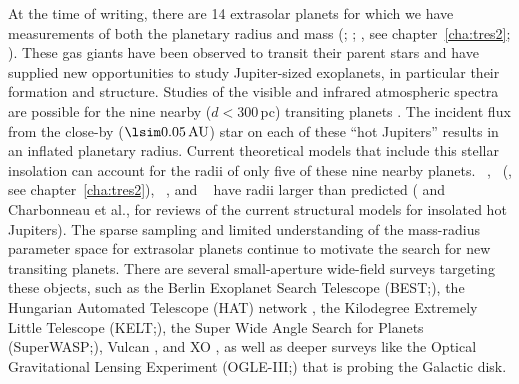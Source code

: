 At the time of writing, there are 14 extrasolar planets for which we have measurements of both the planetary radius
and mass (\citealp*[see][for a review]{Charbonneau_Brown_Burrows:PPV:2007a}; \citealt{McCullough_Stys_Valenti:apj:2006a}; \citealt{ODonovan_Charbonneau_Mandushev:apjl:2006a},%
see chapter~\ref{cha:tres2}; \citealt{Bakos_Noyes_Kovacs:apj:2007a, Collier-Cameron_Bouchy_Hebrard:MNRAS:2007a}).%
These gas giants have been observed to transit their parent stars and have supplied new opportunities to study
Jupiter-sized exoplanets, in particular their formation and structure. Studies of the visible and infrared atmospheric
spectra are possible for the nine nearby ($d<300$\,pc) transiting planets
\citep{Charbonneau_Brown_Noyes:apj:2002a, Vidal-Madjar_Lecavelier-des-Etangs_Desert:nat:2003a, Deming_Brown_Charbonneau:apj:2005a, Deming_Seager_Richardson:nat:2005a, Charbonneau_Allen_Megeath:apj:2005a}.
The incident flux from the close-by (\mbox{$\lsim0.05\,\mathrm{AU}$}) star on each of these ``hot Jupiters'' results
in an inflated planetary radius. Current theoretical models that include this stellar insolation can account for the
radii of only five of these nine nearby planets. \hdTZNb\
\citep{Charbonneau_Brown_Latham:apjl:2000a, Henry_Marcy_Butler:apj:2000a}, \tresTwo\
(\citealp{ODonovan_Charbonneau_Mandushev:apjl:2006a}, see chapter~\ref{cha:tres2}), \hatponeb\
\citep{Bakos_Noyes_Kovacs:apj:2007a}, and \wasponeb\ \citep{Collier-Cameron_Bouchy_Hebrard:MNRAS:2007a}
have radii larger than predicted (\citealp[see][]{Laughlin_Wolf_Vanmunster:apj:2005a} and Charbonneau et al.,%
\citeyear{Charbonneau_Brown_Burrows:PPV:2007a} for reviews of the current structural models for insolated hot Jupiters).%
The sparse sampling and limited understanding of the mass-radius parameter space for extrasolar planets continue to
motivate the search for new transiting planets. There are several small-aperture wide-field surveys targeting these
objects, such as the Berlin Exoplanet Search Telescope (BEST;\@ \citealt{Rauer_Eisloffel_Erikson:pasp:2004a}),
the Hungarian Automated Telescope (HAT) network \citep{Bakos_Lazar_Papp:pasp:2002a, Bakos_Noyes_Kovacs:pasp:2004a},
the Kilodegree Extremely Little Telescope (KELT;\@ \citealt*{Pepper_Gould_Depoy:AIP:2004a}), the Super Wide Angle Search
for Planets (SuperWASP;\@ \citealt{Street_Pollaco_Fitzsimmons:ASP:2003a}), Vulcan \citep{Borucki_Caldwell_Koch:pasp:2001a},
and XO \citep{McCullough_Stys_Valenti:pasp:2005a}, as well as deeper surveys like the Optical Gravitational Lensing
Experiment (OGLE-III;\@ \citealt{Udalski_Paczynski_Zebrun:acta:2002a}) that is probing the Galactic disk.

